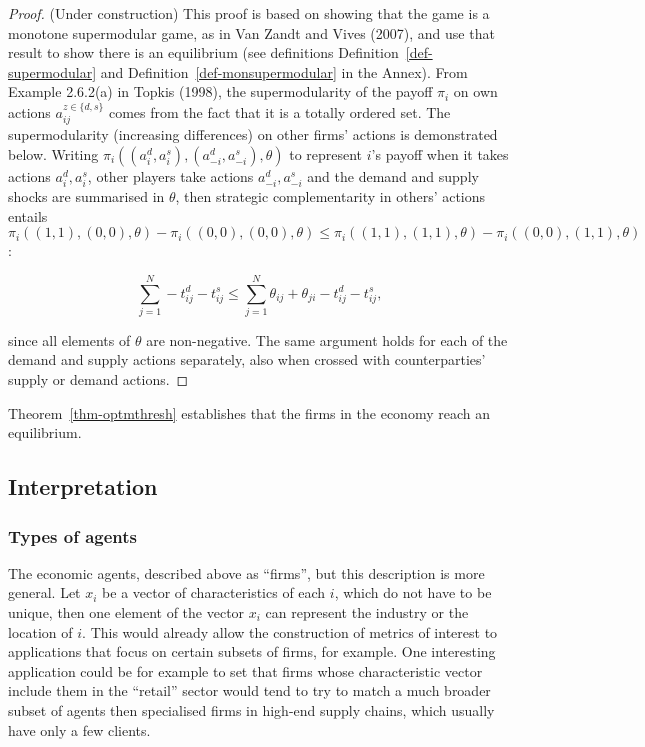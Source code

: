 \documentclass[
]{article}
\theoremstyle{plain}
\theoremstyle{definition}
\theoremstyle{remark}
\begin{document}
\begin{proof}
(Under construction) This proof is based on showing that the game is a
monotone supermodular game, as in Van Zandt and Vives (2007), and use
that result to show there is an equilibrium (see definitions
Definition~\ref{def-supermodular} and
Definition~\ref{def-monsupermodular} in the Annex). From Example
2.6.2(a) in Topkis (1998), the supermodularity of the payoff \(\pi_i\)
on own actions \(a_{ij}^{z \in \{d, s\}}\) comes from the fact that it
is a totally ordered set. The supermodularity (increasing differences)
on other firms' actions is demonstrated below. Writing
\(\pi_i((a_i^d, a_i^s),(a_{-i}^d, a_{-i}^s), \theta)\) to represent
\(i\)'s payoff when it takes actions \(a_i^d, a_i^s\), other players
take actions \(a_{-i}^d, a_{-i}^s\) and the demand and supply shocks are
summarised in \(\theta\), then strategic complementarity in others'
actions entails
\(\pi_i((1,1), (0,0), \theta) - \pi_i((0,0), (0,0), \theta) \leq \pi_i((1,1), (1,1), \theta) - \pi_i((0,0), (1,1), \theta)\):

\[
\sum_{j=1}^N -t_{ij}^d -t_{ij}^s \leq \sum_{j=1}^N \theta_{ij} + \theta_{ji} - t_{ij}^d - t_{ij}^s,
\]

since all elements of \(\theta\) are non-negative. The same argument
holds for each of the demand and supply actions separately, also when
crossed with counterparties' supply or demand actions.
\end{proof}

Theorem~\ref{thm-optmthresh} establishes that the firms in the economy
reach an equilibrium.

\subsection{Interpretation}\label{sec-interpretation}

\subsubsection{Types of agents}\label{types-of-agents}

The economic agents, described above as ``firms'', but this description
is more general. Let \(x_i\) be a vector of characteristics of each
\(i\), which do not have to be unique, then one element of the vector
\(x_i\) can represent the industry or the location of \(i\). This would
already allow the construction of metrics of interest to applications
that focus on certain subsets of firms, for example. One interesting
application could be for example to set that firms whose characteristic
vector include them in the ``retail'' sector would tend to try to match
a much broader subset of agents then specialised firms in high-end
supply chains, which usually have only a few clients.
\end{document}
